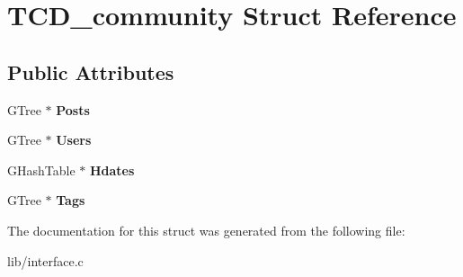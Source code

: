 \hypertarget{structTCD__community}{}\section{T\+C\+D\+\_\+community Struct Reference}
\label{structTCD__community}
\subsection*{Public Attributes}
\begin{DoxyCompactItemize}
\item 
G\+Tree $\ast$ {\bfseries Posts}\hypertarget{structTCD__community_aa8561b088ee97b5d769bcb83f977129e}{}\label{structTCD__community_aa8561b088ee97b5d769bcb83f977129e}

\item 
G\+Tree $\ast$ {\bfseries Users}\hypertarget{structTCD__community_a3c343292c4b9ee4ee4bda8225254bd2d}{}\label{structTCD__community_a3c343292c4b9ee4ee4bda8225254bd2d}

\item 
G\+Hash\+Table $\ast$ {\bfseries Hdates}\hypertarget{structTCD__community_a55bd6a6374eb80d3b1f3f99b26500176}{}\label{structTCD__community_a55bd6a6374eb80d3b1f3f99b26500176}

\item 
G\+Tree $\ast$ {\bfseries Tags}\hypertarget{structTCD__community_a04ab9dccaea7eac6e4dc0c28b1dcb663}{}\label{structTCD__community_a04ab9dccaea7eac6e4dc0c28b1dcb663}

\end{DoxyCompactItemize}


The documentation for this struct was generated from the following file\+:\begin{DoxyCompactItemize}
\item 
lib/interface.\+c\end{DoxyCompactItemize}
